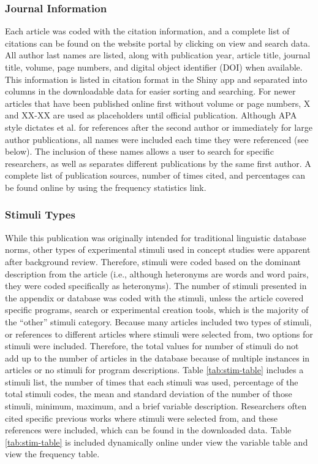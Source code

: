 \documentclass[english,man]{apa6}
\theoremstyle{definition}
\theoremstyle{definition}
\theoremstyle{definition}
\theoremstyle{remark}
\begin{document}
\subsubsection{Journal Information}\label{journal-information}

Each article was coded with the citation information, and a complete
list of citations can be found on the website portal by clicking on view
and search data. All author last names are listed, along with
publication year, article title, journal title, volume, page numbers,
and digital object identifier (DOI) when available. This information is
listed in citation format in the Shiny app and separated into columns in
the downloadable data for easier sorting and searching. For newer
articles that have been published online first without volume or page
numbers, X and XX-XX are used as placeholders until official
publication. Although APA style dictates et al. for references after the
second author or immediately for large author publications, all names
were included each time they were referenced (see below). The inclusion
of these names allows a user to search for specific researchers, as well
as separates different publications by the same first author. A complete
list of publication sources, number of times cited, and percentages can
be found online by using the frequency statistics link.

\subsubsection{Stimuli Types}\label{stimuli-types}

While this publication was originally intended for traditional
linguistic database norms, other types of experimental stimuli used in
concept studies were apparent after background review. Therefore,
stimuli were coded based on the dominant description from the article
(i.e., although heteronyms are words and word pairs, they were coded
specifically as heteronyms). The number of stimuli presented in the
appendix or database was coded with the stimuli, unless the article
covered specific programs, search or experimental creation tools, which
is the majority of the \enquote{other} stimuli category. Because many
articles included two types of stimuli, or references to different
articles where stimuli were selected from, two options for stimuli were
included. Therefore, the total values for number of stimuli do not add
up to the number of articles in the database because of multiple
instances in articles or no stimuli for program descriptions. Table
\ref{tab:stim-table} includes a stimuli list, the number of times that
each stimuli was used, percentage of the total stimuli codes, the mean
and standard deviation of the number of those stimuli, minimum, maximum,
and a brief variable description. Researchers often cited specific
previous works where stimuli were selected from, and these references
were included, which can be found in the downloaded data. Table
\ref{tab:stim-table} is included dynamically online under view the
variable table and view the frequency table.
\end{document}
